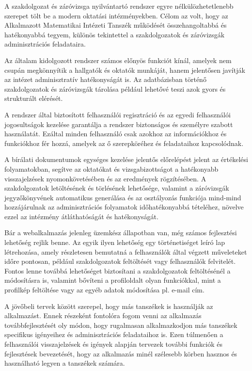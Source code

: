 

A szakdolgozat és záróvizsga nyilvántartó rendszer egyre nélkülözhetetlenebb szerepet tölt be a modern oktatási intézményekben. Célom az volt, hogy az Alkalmazott Matematikai Intézeti Tanszék működését összehangoltabbá és hatékonyabbá tegyem, különös tekintettel a szakdolgozatok és záróvizsgák adminisztrációs feladataira.

Az általam kidolgozott rendszer számos előnyös funkciót kínál, amelyek nem csupán megkönnyítik a hallgatók és oktatók munkáját, hanem jelentősen javítják az intézet adminisztratív hatékonyságát is. Az adatbázisban történő szakdolgozatok és záróvizsgák tárolása például lehetővé teszi azok gyors és strukturált elérését.

A rendszer által biztosított felhasználói regisztráció és az egyedi felhasználói jogosultságok kezelése garantálja a rendszer biztonságos és személyre szabott használatát. Ezáltal minden felhasználó csak azokhoz az információkhoz és funkciókhoz fér hozzá, amelyek az ő szerepköréhez és feladataihoz kapcsolódnak.

A bírálati dokumentumok egységes kezelése jelentős előrelépést jelent az értékelési folyamatokban, segítve az oktatókat és vizsgabizottságot a hatékonyabb visszajelzések nyomonkövetésében és az eredmények rögzítésében. A szakdolgozatok letöltésének és törlésének lehetősége, valamint a záróvizsgák jegyzőkönyvének automatikus generálása és az osztályozás funkciója mind-mind hozzájárulnak az adminisztrációs folyamatok időhatékonyabbá tételéhez, növelve ezzel az intézmény átláthatóságát és hatékonyságát.

Bár a webalkalmazás jelenleg üzemkész állapotban van, még számos fejlesztési lehetőség rejlik benne. Az egyik ilyen lehetőség egy történetiséget leíró lap létrehozása, amely részletesen bemutatná a felhasználók által végzett műveleteket időre pontosan, például szakdolgozatok feltöltését vagy felhasználók felvitelét. Fontos lenne továbbá lehetőséget biztosítani a szakdolgozatok feltöltésénél a módosításra is, valamint bővíteni a profiloldalt olyan funkciókkal, mint a profilkép feltöltése vagy az egyéb adatok módosítása pl. e-mail cím.

A jövőbeli tervek között szerepel, hogy más tanszékek is használják az alkalmazást. Ennek részeként fontolóra fogom venni az alkalmazás továbbfejlesztését oly módon, hogy rugalmasan alkalmazkodjon más tanszékek specifikus igényeihez és adminisztrációs feladataihoz is. Ezen túlmenően a felhasználói visszajelzések és igények alapján tervezek további funkciók és fejlesztések bevezetését, hogy az alkalmazás minél szélesebb körben hasznos és használható legyen a tanszékek számára. 

